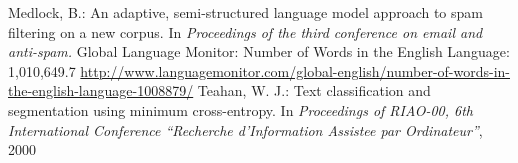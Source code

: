 \documentclass[runningheads,a4paper]{llncs}
\begin{document}
\begin{thebibliography}{4}
 Medlock, B.: An adaptive, semi-structured language model approach to spam filtering on a new corpus. In \emph{Proceedings of the third conference on email and anti-spam.}
 Global Language Monitor: Number of Words in the English Language: 1,010,649.7 \url{http://www.languagemonitor.com/global-english/number-of-words-in-the-english-language-1008879/}
 Teahan, W. J.: Text classification and segmentation using minimum cross-entropy. In \emph{Proceedings of RIAO-00, 6th International Conference “Recherche d’Information Assistee par Ordinateur”}, 2000

\end{thebibliography}
\end{document}
